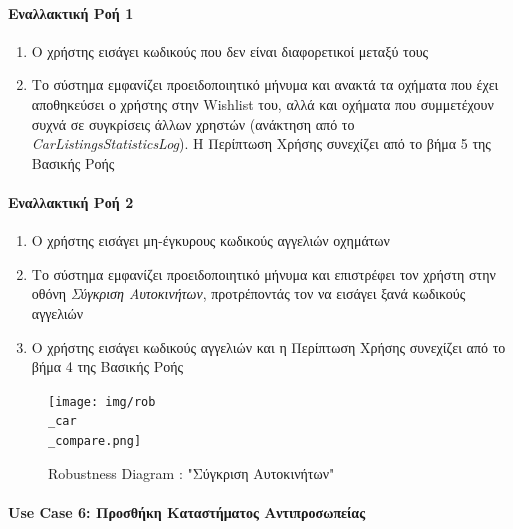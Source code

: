 \documentclass{../ol-softwaremanual}
\begin{document}
	\paragraph{Εναλλακτική Ροή 1}
	
	\begin{enumerate}
		\item Ο χρήστης εισάγει κωδικούς που δεν είναι διαφορετικοί μεταξύ τους
		\item Το σύστημα εμφανίζει προειδοποιητικό μήνυμα και ανακτά τα οχήματα που έχει αποθηκεύσει ο χρήστης στην \en Wishlist \gr του, αλλά και οχήματα που συμμετέχουν συχνά σε συγκρίσεις άλλων χρηστών (ανάκτηση από το \en \textit{CarListingsStatisticsLog}\gr). Η Περίπτωση Χρήσης συνεχίζει από το βήμα 5 της Βασικής Ροής 
	\end{enumerate}
	
	\paragraph{Εναλλακτική Ροή 2}
	\begin{enumerate}
		\item Ο χρήστης εισάγει μη-έγκυρους κωδικούς αγγελιών οχημάτων
		\item Το σύστημα εμφανίζει προειδοποιητικό μήνυμα και επιστρέφει τον χρήστη στην οθόνη \textit{Σύγκριση Αυτοκινήτων}, προτρέποντάς τον να εισάγει ξανά κωδικούς αγγελιών
		\item Ο χρήστης εισάγει κωδικούς αγγελιών και η Περίπτωση Χρήσης συνεχίζει από το βήμα 4 της Βασικής Ροής		
	\end{enumerate}
	
	
	\begin{figure}[htbp!]
		\texttt{[image: img/rob\\\_car\\\_compare.png]}
		\caption{\en Robustness Diagram : "\gr Σύγκριση Αυτοκινήτων\en"\gr}
	\end{figure}
	
	\newpage
	\centering
	\paragraph{\en Use Case 6: \gr Προσθήκη Καταστήματος Αντιπροσωπείας}
	
\end{document}
